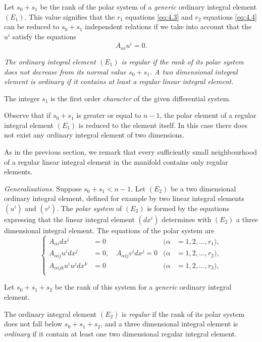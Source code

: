 Let $s_{0}+s_{1}$ be the rank of the polar system of a \emph{generic} ordinary integral element $(E_{1})$. This value signifies that the $r_{1}$ equations \eqref{eq:4.3}  and $r_{2}$ equations \eqref{eq:4.4} can be reduced to $s_{0}+s_{1}$ independent relations if we take into account that the $u^{i}$ satisfy the equations
\[
A_{\alpha i}u^{i}=0.
\]

\emph{The ordinary integral element $(E_{1})$ is regular if the rank of its polar system does not decrease from its normal value $s_{0}+s_{1}$. A two dimensional integral element  is  ordinary if it contains at least a regular linear integral element.}

The integer $s_{1}$ is  the first order \emph{character} of the given differential system.

Observe that if $s_{0}+s_{1}$ is greater or equal to $n-1$, the polar element of a regular integral element $(E_{1}) $ is reduced to the element itself. In this case there does not exist any ordinary integral element of two dimensions.

As in the previous section, we  remark that every sufficiently small neighbourhood of a regular linear integral element  in the manifold contains only regular elements.

\vspace{12pt}\fsec \emph{Generalisations.} Suppose $s_{0}+s_{1}<n-1$. Let $(E_{2})$ be a two dimensional ordinary integral element, defined for example by two linear integral elements $(u^{i})$ and $(v^{i})$. The \emph{polar system} of $(E_{2})$ is formed by the equations expressing that the linear integral element $(dx^{i})$ determines with $(E_{2})$ a three dimensional integral element. The equations of the polar system are
\begin{equation}
  \label{eq:4.5}
  \left\{
    \begin{aligned}
      A_{\alpha i}dx^{i}&=0&(\alpha&=1,2,\dots,r_{1}),\\
      A_{\alpha ij}u^{i}dx^{j}&=0,\quad A_{\alpha ij}v^{i}dx^{j}=0&(\alpha&=1,2,\dots,r_{2}),\\
      A_{\alpha ijk}u^{i}u^{j}dx^{k}&=0&(\alpha&=1,2,\dots,r_{3}),\\
    \end{aligned}
  \right.
\end{equation}

Let $s_{0}+s_{1}+s_{2}$ be the rank of this system for a \emph{generic} ordinary integral element.

The ordinary integral element $(E_{2})$ is  \emph{regular} if the rank of its polar system does not fall below $s_{0}+s_{1}+s_{2}$, and a three dimensional integral element is  \emph{ordinary} if it contain at least one two dimensional regular integral element.

